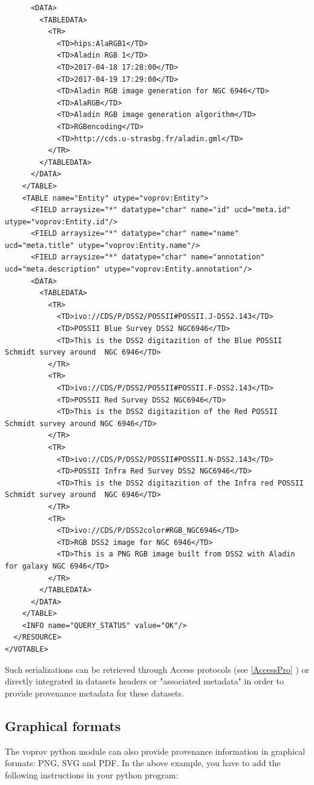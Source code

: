 \begin{verbatim}
      <DATA>
        <TABLEDATA>
          <TR>
            <TD>hips:AlaRGB1</TD>
            <TD>Aladin RGB 1</TD>
            <TD>2017-04-18 17:28:00</TD>
            <TD>2017-04-19 17:29:00</TD>
            <TD>Aladin RGB image generation for NGC 6946</TD>
            <TD>AlaRGB</TD>
            <TD>Aladin RGB image generation algorithm</TD>
            <TD>RGBencoding</TD>
            <TD>http://cds.u-strasbg.fr/aladin.gml</TD>
          </TR>
        </TABLEDATA>
      </DATA>
    </TABLE>
    <TABLE name="Entity" utype="voprov:Entity">
      <FIELD arraysize="*" datatype="char" name="id" ucd="meta.id" utype="voprov:Entity.id"/>
      <FIELD arraysize="*" datatype="char" name="name" ucd="meta.title" utype="voprov:Entity.name"/>
      <FIELD arraysize="*" datatype="char" name="annotation" ucd="meta.description" utype="voprov:Entity.annotation"/>
      <DATA>
        <TABLEDATA>
          <TR>
            <TD>ivo://CDS/P/DSS2/POSSII#POSSII.J-DSS2.143</TD>
            <TD>POSSII Blue Survey DSS2 NGC6946</TD>
            <TD>This is the DSS2 digitazition of the Blue POSSII Schmidt survey around  NGC 6946</TD>
          </TR>
          <TR>
            <TD>ivo://CDS/P/DSS2/POSSII#POSSII.F-DSS2.143</TD>
            <TD>POSSII Red Survey DSS2 NGC6946</TD>
            <TD>This is the DSS2 digitazition of the Red POSSII Schmidt survey around NGC 6946</TD>
          </TR>
          <TR>
            <TD>ivo://CDS/P/DSS2/POSSII#POSSII.N-DSS2.143</TD>
            <TD>POSSII Infra Red Survey DSS2 NGC6946</TD>
            <TD>This is the DSS2 digitazition of the Infra red POSSII Schmidt survey around  NGC 6946</TD>
          </TR>
          <TR>
            <TD>ivo://CDS/P/DSS2color#RGB_NGC6946</TD>
            <TD>RGB DSS2 image for NGC 6946</TD>
            <TD>This is a PNG RGB image built from DSS2 with Aladin for galaxy NGC 6946</TD>
          </TR>
        </TABLEDATA>
      </DATA>
    </TABLE>
    <INFO name="QUERY_STATUS" value="OK"/>
  </RESOURCE>
</VOTABLE>

\end{verbatim}
  
Such serializations can be retrieved through Access protocols (see \ref{AccessPro} ) or directly integrated in datasets headers or "associated metadata" in order to provide provenance metadata for these datasets. 

\subsection{Graphical formats}
\label{Graphics}
The voprov python module can also provide provenance information in graphical formats: PNG, SVG and PDF.
In the above example, you have to add the following instructions in your python program:

